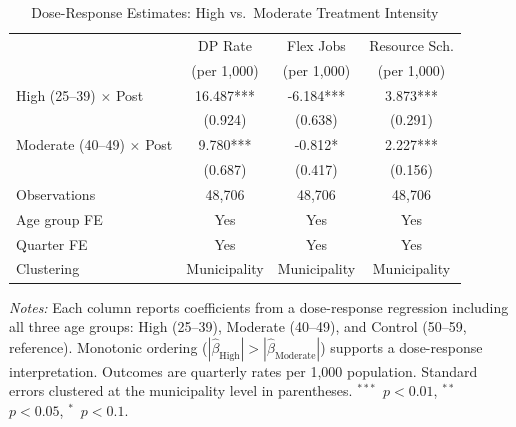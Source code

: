 \begin{table}[htbp]
\centering
\caption{Dose-Response Estimates: High vs.\ Moderate Treatment Intensity}
\label{tab:dose_response}
\small
\begin{tabular}{l*{3}{c}}
\toprule
 & DP Rate & Flex Jobs & Resource Sch. \\
 & (per 1,000) & (per 1,000) & (per 1,000) \\
\midrule
High (25--39) $\times$ Post & 16.487*** & -6.184*** & 3.873*** \\
 & (0.924) & (0.638) & (0.291) \\
\addlinespace
Moderate (40--49) $\times$ Post & 9.780*** & -0.812* & 2.227*** \\
 & (0.687) & (0.417) & (0.156) \\
\midrule
Observations & 48,706 & 48,706 & 48,706 \\
Age group FE & Yes & Yes & Yes \\
Quarter FE & Yes & Yes & Yes \\
Clustering & Municipality & Municipality & Municipality \\
\bottomrule
\end{tabular}
\begin{tablenotes}
\small
\item \textit{Notes:} Each column reports coefficients from a dose-response regression including all three age groups: High (25--39), Moderate (40--49), and Control (50--59, reference). Monotonic ordering ($|\hat{\beta}_{\text{High}}| > |\hat{\beta}_{\text{Moderate}}|$) supports a dose-response interpretation. Outcomes are quarterly rates per 1,000 population. Standard errors clustered at the municipality level in parentheses. $^{***}$~$p<0.01$, $^{**}$~$p<0.05$, $^{*}$~$p<0.1$.
\end{tablenotes}
\end{table}
